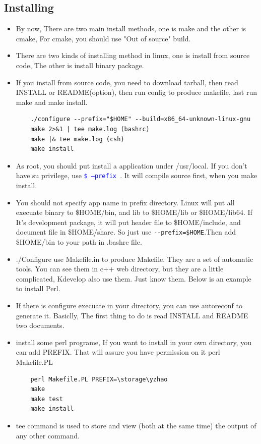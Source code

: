 \documentclass[a4paper,12pt,twoside]{book}
\newcommand{\linuxcommand}[1]{\texttt{\textcolor{blue}{\$ #1 \Pisymbol{psy}{191}}}}
\begin{document}
\subsection{Installing}
	\begin{itemize}
			\item By now, There are two main install methods, one is make and the other is cmake, For cmake, you should use "Out of source" build. 

	\item There are two kinds of installing method in linux, one is install from source code, The other is install binary package.

    \item If you install from source code, you need to download tarball, then read INSTALL or README(option), then run config to produce makefile, last run make and make install.
\begin{verbatim}
	./configure --prefix="$HOME" --build=x86_64-unknown-linux-gnu 
	make 2>&1 | tee make.log (bashrc)
	make |& tee make.log (csh)
	make install 
\end{verbatim}

     \item As root, you should put install a application under /usr/local. If you don't have su privilege, use \linuxcommand{--prefix}.  It will compile source first, when you make install.

	 \item You should not specify app name in prefix directory. Linux will put all execuate binary to \$HOME/bin, and lib to \$HOME/lib or \$HOME/lib64. If It's development package, it will put header file to \$HOME/include, and document file in \$HOME/share. So just use \verb!--prefix=$HOME!.Then add \$HOME/bin to your path in .bashrc file.  
	
		\item./Configure use Makefile.in to produce Makefile. They are a set of automatic tools. You can see them in c++ web directory, but they are a little complicated, Kdevelop also use them.  Just know them.  Below is an example to install Perl.

		\item If there is configure execuate in your directory, you can use autoreconf to generate it. Basiclly, The first thing to do is read INSTALL and README two documents. 

	 \item install some perl programe, If you want to install in your own directory, you can add PREFIX. That will assure you have permission on it
  	 perl Makefile.PL
    \begin{verbatim}
    perl Makefile.PL PREFIX=\storage\yzhao
    make
    make test
    make install
    \end{verbatim}
\item tee command is used to store and view (both at the same time) the output of any other command. 


\end{itemize}
\end{document}
